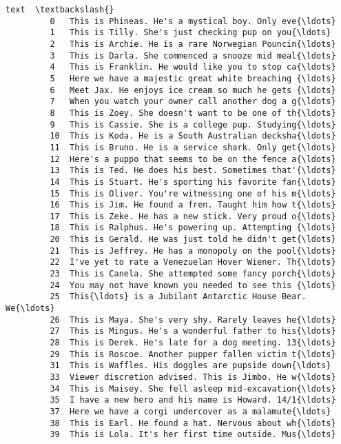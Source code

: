 \documentclass[11pt]{article}
\begin{document}
\begin{Verbatim}[commandchars=\\\{\}]
                                                          text  \textbackslash{}
         0   This is Phineas. He's a mystical boy. Only eve{\ldots}   
         1   This is Tilly. She's just checking pup on you{\ldots}   
         2   This is Archie. He is a rare Norwegian Pouncin{\ldots}   
         3   This is Darla. She commenced a snooze mid meal{\ldots}   
         4   This is Franklin. He would like you to stop ca{\ldots}   
         5   Here we have a majestic great white breaching {\ldots}   
         6   Meet Jax. He enjoys ice cream so much he gets {\ldots}   
         7   When you watch your owner call another dog a g{\ldots}   
         8   This is Zoey. She doesn't want to be one of th{\ldots}   
         9   This is Cassie. She is a college pup. Studying{\ldots}   
         10  This is Koda. He is a South Australian decksha{\ldots}   
         11  This is Bruno. He is a service shark. Only get{\ldots}   
         12  Here's a puppo that seems to be on the fence a{\ldots}   
         13  This is Ted. He does his best. Sometimes that'{\ldots}   
         14  This is Stuart. He's sporting his favorite fan{\ldots}   
         15  This is Oliver. You're witnessing one of his m{\ldots}   
         16  This is Jim. He found a fren. Taught him how t{\ldots}   
         17  This is Zeke. He has a new stick. Very proud o{\ldots}   
         18  This is Ralphus. He's powering up. Attempting {\ldots}   
         20  This is Gerald. He was just told he didn't get{\ldots}   
         21  This is Jeffrey. He has a monopoly on the pool{\ldots}   
         22  I've yet to rate a Venezuelan Hover Wiener. Th{\ldots}   
         23  This is Canela. She attempted some fancy porch{\ldots}   
         24  You may not have known you needed to see this {\ldots}   
         25  This{\ldots} is a Jubilant Antarctic House Bear. We{\ldots}   
         26  This is Maya. She's very shy. Rarely leaves he{\ldots}   
         27  This is Mingus. He's a wonderful father to his{\ldots}   
         28  This is Derek. He's late for a dog meeting. 13{\ldots}   
         29  This is Roscoe. Another pupper fallen victim t{\ldots}   
         31  This is Waffles. His doggles are pupside down{\ldots}   
         33  Viewer discretion advised. This is Jimbo. He w{\ldots}   
         34  This is Maisey. She fell asleep mid-excavation{\ldots}   
         35  I have a new hero and his name is Howard. 14/1{\ldots}   
         37  Here we have a corgi undercover as a malamute{\ldots}   
         38  This is Earl. He found a hat. Nervous about wh{\ldots}   
         39  This is Lola. It's her first time outside. Mus{\ldots}   

\end{Verbatim}
\end{document}
